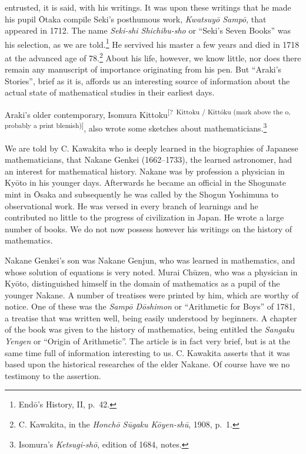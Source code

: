 \documentclass[11pt]{article}
\newcommand{\scanpage}[2]{\clearpage\setcounter{footnote}{0}\noindent{\footnotesize\color{gray}PDF page #1 · #2}\par\medskip}
\newcommand{\unclear}[1]{\textsuperscript{[?~#1]}}
\begin{document}
\scanpage{0337}{printed page 323}
\noindent entrusted, it is said, with his writings. It was upon these writings that he made his pupil Ōtaka compile Seki's posthumous work, \emph{Kwatsuyō Sampō}, that appeared in 1712. The name \emph{Seki-shi Shichibu-sho} or ``Seki's Seven Books'' was his selection, as we are told.\footnote{Endō's History, II, p.~42.} He servived his master a few years and died in 1718 at the advanced age of 78.\footnote{C. Kawakita, in the \emph{Honchō Sūgaku Kōyen-shū}, 1908, p.~1.} About his life, however, we know little, nor does there remain any manuscript of importance originating from his pen. But ``Araki's Stories'', brief as it is, affords us an interesting source of information about the actual state of mathematical studies in their earliest days.

Araki's older contemporary, Isomura Kittoku\unclear{Kittoku / Kittóku (mark above the o, probably a print blemish)}, also wrote some sketches about mathematicians.\footnote{Isomura's \emph{Ketsugi-shō}, edition of 1684, notes.}

We are told by C. Kawakita who is deeply learned in the biographies of Japanese mathematicians, that Nakane Genkei (1662--1733), the learned astronomer, had an interest for mathematical history. Nakane was by profession a physician in Kyōto in his younger days. Afterwards he became an official in the Shogunate mint in Ōsaka and subsequently he was called by the Shogun Yoshimuna to observational work. He was versed in every branch of learnings and he contributed no little to the progress of civilization in Japan. He wrote a large number of books. We do not now possess however his writings on the history of mathematics.

Nakane Genkei's son was Nakane Genjun, who was learned in mathematics, and whose solution of equations is very noted. Murai Chūzen, who was a physician in Kyōto, distinguished himself in the domain of mathematics as a pupil of the younger Nakane. A number of treatises were printed by him, which are worthy of notice. One of these was the \emph{Sampō Dōshimon} or ``Arithmetic for Boys'' of 1781, a treatise that was written well, being easily understood by beginners. A chapter of the book was given to the history of mathematics, being entitled the \emph{Sangaku Yengen} or ``Origin of Arithmetic''. The article is in fact very brief, but is at the same time full of information interesting to us. C. Kawakita asserts that it was based upon the historical researches of the elder Nakane. Of course have we no testimony to the assertion.
\end{document}
